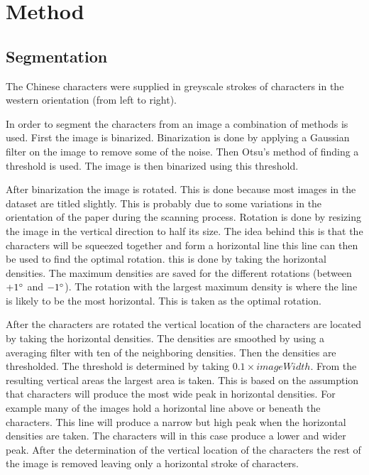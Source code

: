 \section{Method} %
\label{sec:method}



\subsection{Segmentation}


The Chinese characters were supplied in greyscale strokes of characters in the western orientation (from left to right).

In order to segment the characters from an image a combination of methods is used. First the image is binarized. Binarization is done by applying a Gaussian filter on the image to remove some of the noise. Then Otsu's method of finding a threshold is used. The image is then binarized using this threshold.


After binarization the image is rotated. This is done because most images in the dataset are titled slightly. This is probably due to some variations in the orientation of the paper during the scanning process. Rotation is done by resizing the image in the vertical direction to half its size. The idea behind this is that the characters will be squeezed together and form a horizontal line this line can then be used to find the optimal rotation. this is done by taking the horizontal densities. The maximum densities are saved for the different rotations (between $+1\degree$ and $-1\degree$). The rotation with the largest maximum density is where the line is likely to be the most horizontal. This is taken as the optimal rotation. 


After the characters are rotated the vertical location of the characters are located by taking the horizontal densities. The densities are smoothed by using a averaging filter with ten of the neighboring densities. Then the densities are thresholded. The threshold is determined by taking $0.1 \times imageWidth$. From the resulting vertical areas the largest area is taken. This is based on the assumption that characters will produce the most wide peak in horizontal densities. For example many of the images hold a horizontal line above or beneath the characters. This line will produce a narrow but high peak when the horizontal densities are taken. The characters will in this case produce a lower and wider peak. After the determination of the vertical location of the characters the rest of the image is removed leaving only a horizontal stroke of characters.


